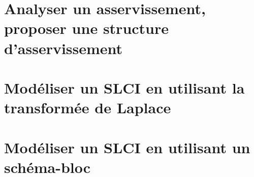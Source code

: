 \section{Analyser un asservissement, proposer une structure d'asservissement} 
\clearpage 
\newpage 
\section{Modéliser un SLCI en utilisant la transformée de Laplace} 
\graphicspath{{\repStyle/png/}{../SLCI/SLCI-02-FT/51_MCC/images/}} 
 
 
\clearpage 
\newpage 
\section{Modéliser un SLCI en utilisant un schéma-bloc} 
\graphicspath{{\repStyle/png/}{../SLCI/SLCI-03-SchemaBlocs/39_SeineMusicale/images/}} 
 
 
\graphicspath{{\repStyle/png/}{../SLCI/SLCI-03-SchemaBlocs/47_SysReeduc/images/}} 
 
 
\graphicspath{{\repStyle/png/}{../SLCI/SLCI-03-SchemaBlocs/48_Quille/images/}} 
 
 
\graphicspath{{\repStyle/png/}{../SLCI/SLCI-03-SchemaBlocs/500_Divers/images/}} 
 
 
\graphicspath{{\repStyle/png/}{../SLCI/SLCI-03-SchemaBlocs/505_Divers/images/}} 
 
 
\graphicspath{{\repStyle/png/}{../SLCI/SLCI-03-SchemaBlocs/512_Divers/images/}} 
 
 
\graphicspath{{\repStyle/png/}{../SLCI/SLCI-03-SchemaBlocs/51_MCC/images/}} 
 
 
\graphicspath{{\repStyle/png/}{../SLCI/SLCI-03-SchemaBlocs/52_Verin/images/}} 
 
 
\graphicspath{{\repStyle/png/}{../SLCI/SLCI-03-SchemaBlocs/53_BancEpreuveHydraulique/images/}} 
 
 
